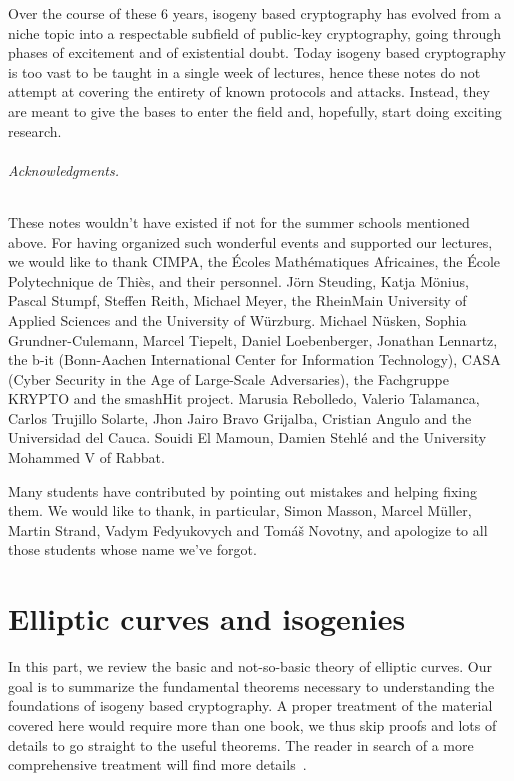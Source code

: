 \documentclass[10pt]{article}
\theoremstyle{plain}
\theoremstyle{definition}
\begin{document}
Over the course of these 6 years, isogeny based cryptography has
evolved from a niche topic into a respectable subfield of public-key
cryptography, going through phases of excitement and of existential
doubt. %
Today isogeny based cryptography is too vast to be taught in a single
week of lectures, hence these notes do not attempt at covering the
entirety of known protocols and attacks. %
Instead, they are meant to give the bases to enter the field and,
hopefully, start doing exciting research.

\paragraph{Acknowledgments.}
These notes wouldn't have existed if not for the summer schools
mentioned above. %
For having organized such wonderful events and supported our lectures,
we would like to thank CIMPA, the Écoles Mathématiques Africaines, the
École Polytechnique de Thiès, and their personnel. %
Jörn Steuding, Katja Mönius, Pascal Stumpf, Steffen Reith, Michael
Meyer, the RheinMain University of Applied Sciences and the University
of Würzburg. %
Michael Nüsken, Sophia Grundner-Culemann, Marcel Tiepelt, Daniel
Loebenberger, Jonathan Lennartz, the b-it (Bonn-Aachen International
Center for Information Technology), CASA (Cyber Security in the Age of
Large-Scale Adversaries), the Fachgruppe KRYPTO and the smashHit
project. %
Marusia Rebolledo, Valerio Talamanca, Carlos Trujillo Solarte, Jhon
Jairo Bravo Grijalba, Cristian Angulo and the Universidad del Cauca. %
Souidi El Mamoun, Damien Stehlé and the University Mohammed V of
Rabbat.

Many students have contributed by pointing out mistakes and helping
fixing them. %
We would like to thank, in particular, Simon Masson, Marcel Müller,
Martin Strand, Vadym Fedyukovych and Tomáš Novotny, and apologize
to all those students whose name we've forgot.

\clearpage
{
  \hypersetup{linkcolor=black}
  \setcounter{tocdepth}{1}
  \tableofcontents
}


\clearpage
\part{Elliptic curves and isogenies}

In this part, we review the basic and not-so-basic theory of elliptic
curves. %
Our goal is to summarize the fundamental theorems necessary to
understanding the foundations of isogeny based cryptography. %
A proper treatment of the material covered here would require more
than one book, we thus skip proofs and lots of details to go straight
to the useful theorems. %
The reader in search of a more comprehensive treatment will find more
details~\cite{silverman:elliptic,silverman:advanced,lang1987elliptic,neukirch2013algebraic}. %
\end{document}
